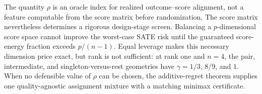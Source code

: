 The quantity \(\rho\) is an oracle index for realized outcome--score alignment, not a feature computable from the score matrix before randomization. The score matrix nevertheless determines a rigorous design-stage screen. Balancing a \(p\)-dimensional score space cannot improve the worst-case SATE risk until the guaranteed score-energy fraction exceeds \(p/(n-1)\). Equal leverage makes this necessary dimension price exact, but rank is not sufficient: at rank one and \(n=4\), the pair, intermediate, and singleton-versus-rest geometries have \(\gamma=1/3\), \(8/9\), and \(1\). When no defensible value of \(\rho\) can be chosen, the additive-regret theorem supplies one quality-agnostic assignment mixture with a matching minimax certificate.
